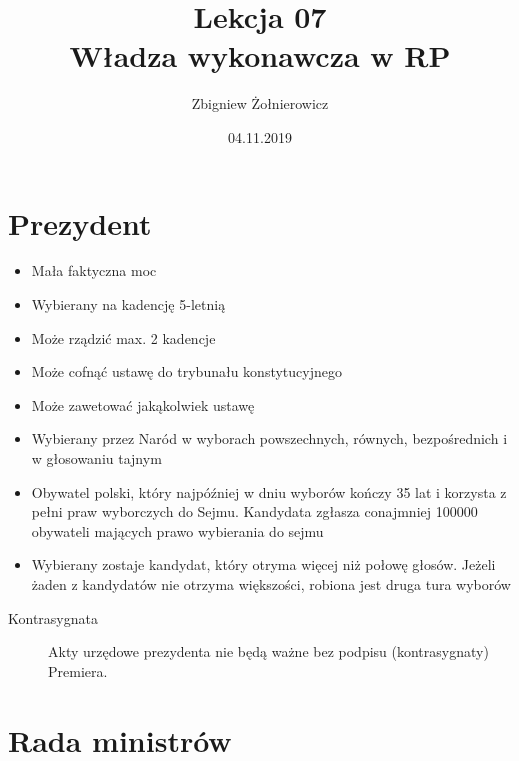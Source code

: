 \documentclass[a4paper]{article}
\begin{document}
\title{{\huge Lekcja 07} \\
{\large Władza wykonawcza w RP}}
\author{Zbigniew Żołnierowicz}
\date{04.11.2019}
\maketitle
\section{Prezydent}
\begin{itemize}
    \item Mała faktyczna moc
    \item Wybierany na kadencję 5-letnią
    \item Może rządzić max. 2 kadencje
    \item Może cofnąć ustawę do trybunału konstytucyjnego
    \item Może zawetować jakąkolwiek ustawę
    \item Wybierany przez Naród w wyborach powszechnych, równych, bezpośrednich i w głosowaniu tajnym
    \item Obywatel polski, który najpóźniej w dniu wyborów kończy 35 lat i korzysta z pełni praw wyborczych do Sejmu. Kandydata zgłasza conajmniej 100000 obywateli mających prawo wybierania do sejmu
    \item Wybierany zostaje kandydat, który otryma więcej niż połowę głosów. Jeżeli żaden z kandydatów nie otrzyma większości, robiona jest druga tura wyborów
\end{itemize}
\begin{description}
    \item[Kontrasygnata] Akty urzędowe prezydenta nie będą ważne bez podpisu (kontrasygnaty) Premiera.
\end{description}
\section{Rada ministrów}
\end{document}
